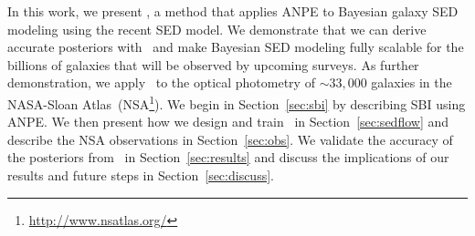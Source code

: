 
In this work, we present \sedflow, a method that applies ANPE to Bayesian
galaxy SED modeling using the recent \cite{hahn2022} SED model. 
We demonstrate that we can derive accurate posteriors with \sedflow~and make
Bayesian SED modeling fully scalable for the billions of galaxies that will be
observed by upcoming surveys.
As further demonstration, we apply \sedflow~to the optical photometry of
${\sim}33,000$ galaxies in the NASA-Sloan
Atlas~(NSA\footnote{\url{http://www.nsatlas.org/}}). 
We begin in Section~\ref{sec:sbi} by describing SBI using ANPE.
We then present how we design and train \sedflow~in Section~\ref{sec:sedflow}
and describe the NSA observations in Section~\ref{sec:obs}. 
We validate the accuracy of the posteriors from \sedflow~in
Section~\ref{sec:results} and discuss the implications of our results and
future steps in Section~\ref{sec:discuss}. 

